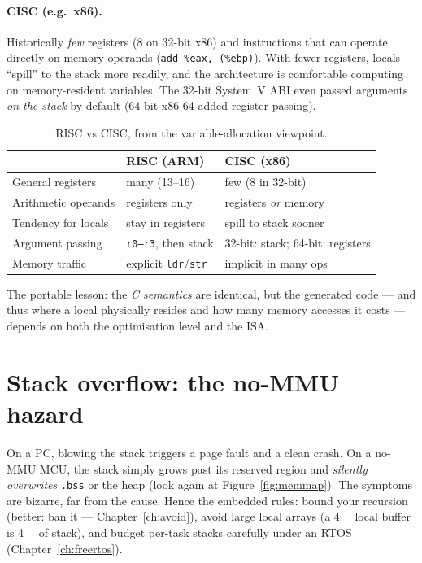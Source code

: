 \documentclass[11pt,a4paper,oneside]{book}
\newcommand{\code}[1]{\texttt{#1}}
\begin{document}
\paragraph{CISC (e.g.\ x86).} Historically \emph{few} registers (8 on 32-bit
x86) and instructions that can operate directly on memory operands
(\code{add \%eax, (\%ebp)}). With fewer registers, locals ``spill'' to the
stack more readily, and the architecture is comfortable computing on
memory-resident variables. The 32-bit System~V ABI even passed arguments
\emph{on the stack} by default (64-bit x86-64 added register passing).

\begin{table}[h]
\centering
\caption{RISC vs CISC, from the variable-allocation viewpoint.}
\small
\begin{tabular}{@{}lll@{}}
\toprule
 & \textbf{RISC (ARM)} & \textbf{CISC (x86)}\\
\midrule
General registers      & many (13--16) & few (8 in 32-bit)\\
Arithmetic operands    & registers only & registers \emph{or} memory\\
Tendency for locals    & stay in registers & spill to stack sooner\\
Argument passing        & \code{r0--r3}, then stack & 32-bit: stack; 64-bit: registers\\
Memory traffic          & explicit \code{ldr}/\code{str} & implicit in many ops\\
\bottomrule
\end{tabular}
\end{table}

The portable lesson: the \emph{C semantics} are identical, but the generated
code --- and thus where a local physically resides and how many memory accesses
it costs --- depends on both the optimisation level and the ISA.

\section{Stack overflow: the no-MMU hazard}
On a PC, blowing the stack triggers a page fault and a clean crash. On a
no-MMU MCU, the stack simply grows past its reserved region and \emph{silently
overwrites} \code{.bss} or the heap (look again at Figure~\ref{fig:memmap}).
The symptoms are bizarre, far from the cause. Hence the embedded rules:
bound your recursion (better: ban it --- Chapter~\ref{ch:avoid}), avoid large
local arrays (a \qty{4}{\kilo\byte} local buffer is \qty{4}{\kilo\byte} of
stack), and budget per-task stacks carefully under an RTOS
(Chapter~\ref{ch:freertos}).
\end{document}
